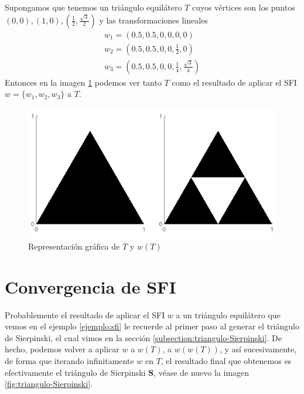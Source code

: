 \begin{ejemplo}
    \label{ejemplo:sfi}
    Supongamos que tenemos un triángulo equilátero $T$ cuyos vértices son los puntos $(0,0),(1,0),(\frac{1}{2},\frac{\sqrt{3}}{2})$ y las transformaciones lineales
    \begin{eqnarray*}
        w_1 = \left(0.5,0.5,0,0,0,0\right) \\
        w_2 = \left(0.5,0.5,0,0,\frac 1 2,0\right) \\
        w_3 = \left(0.5,0.5,0,0,\frac 1 4,\frac{\sqrt{3}}{4}\right)
    \end{eqnarray*}
    Entonces en la imagen \ref{fig:ejemplo-sfi} podemos ver tanto $T$ como el resultado de aplicar el SFI $w=\{w_1,w_2,w_3\}$ a $T$.
    \begin{figure} [ht]
    \centering
    \includegraphics[scale = 0.6]{img/C4/ejemplo-sfi.png}
    \caption{Representación gráfica de $T$ y $w(T)$}
        \label{fig:ejemplo-sfi}
    \end{figure}
\end{ejemplo}

\section{Convergencia de SFI}
\label{section:convergencia-sfi}

Probablemente el resultado de aplicar el SFI $w$ a un triángulo equilátero que vemos en el ejemplo \ref{ejemplo:sfi} le recuerde al primer paso al generar el triángulo de Sierpinski, el cual vimos en la sección \ref{subsection:triangulo-Sierpinski}. De hecho, podemos volver a aplicar $w$ a $w(T)$, a $w(w(T))$, y así sucesivamente, de forma que iterando infinitamente $w$ en $T$, el resultado final que obtenemos es efectivamente el triángulo de Sierpinski \textbf{S}, véase de nuevo la imagen \ref{fig:triangulo-Sierpinski}.

